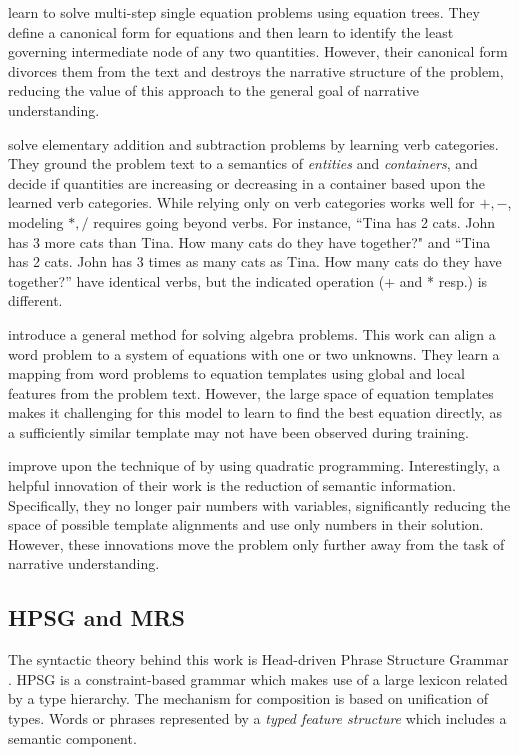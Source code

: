  learn to solve multi-step single equation problems using equation trees. 
They define a canonical form for equations and then learn to identify the least governing intermediate node of any two quantities. 
However, their canonical form divorces them from the text and destroys the narrative structure of the problem, reducing the value of this approach to the general goal of narrative understanding.

 solve elementary addition and subtraction problems by learning verb categories. 
They ground the problem text to a semantics of {\it entities} and {\it containers}, and  decide if quantities are increasing or
decreasing in a container based upon the learned verb categories.
While relying only on verb categories works well for $+,-$, 
modeling $*,/$ requires going beyond verbs. 
For instance, ``Tina has 2 cats. John has 3 more cats than Tina. How many cats do they have together?" and ``Tina has 2 cats. John has 3 times as many cats as Tina. How many cats do they have together?'' have identical verbs, but the indicated operation  (+ and * resp.) is different. 


 introduce a general method for solving algebra problems. 
This work can align a word problem to a system of equations with one or two unknowns. 
They learn a mapping from word problems to equation templates using global and local features from the problem text. 
However, the large space of equation templates makes it challenging for this model to learn to find the best equation directly, as a sufficiently similar template may not have been observed during training. 

 improve upon the technique of  by using quadratic programming. 
Interestingly, a helpful innovation of their work is the reduction of semantic information. 
Specifically, they no longer pair numbers with variables, significantly reducing the space of possible template alignments and use only numbers in their solution.
However, these innovations move the problem only further away from the task of narrative understanding. 


\subsection{HPSG and MRS}

The syntactic theory behind this work is Head-driven Phrase Structure Grammar \cite{Pol:Sag:94}. 
HPSG is a constraint-based grammar which makes use of a large lexicon related by a type hierarchy.
The mechanism for composition is based on unification of types.
Words or phrases represented by a {\it typed feature structure} which includes a semantic component. 


